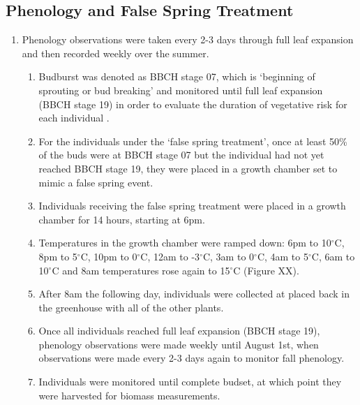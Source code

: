 \documentclass{article}\usepackage[]{graphicx}\usepackage[]{color}
\begin{document}
\subsection*{Phenology and False Spring Treatment}
\begin{enumerate}
\item Phenology observations were taken every 2-3 days through full leaf expansion and then recorded weekly over the summer.
  \begin{enumerate}
  \item Budburst was denoted as BBCH stage 07, which is `beginning of sprouting or bud breaking' and monitored until full leaf expansion (BBCH stage 19) in order to evaluate the duration of vegetative risk for each individual \citep{Finn2007}.
  \item For the individuals under the `false spring treatment', once at least 50\% of the buds were at BBCH stage 07 but the individual had not yet reached BBCH stage 19, they were placed in a growth chamber set to mimic a false spring event.
  \item Individuals receiving the false spring treatment were placed in a growth chamber for 14 hours, starting at 6pm. 
  \item Temperatures in the growth chamber were ramped down: 6pm to 10$^{\circ}$C, 8pm to 5$^{\circ}$C, 10pm to 0$^{\circ}$C, 12am to -3$^{\circ}$C, 3am to 0$^{\circ}$C, 4am to 5$^{\circ}$C, 6am to 10$^{\circ}$C and 8am temperatures rose again to 15$^{\circ}$C (Figure XX).
  \item After 8am the following day, individuals were collected at placed back in the greenhouse with all of the other plants. 
  \item Once all individuals reached full leaf expansion (BBCH stage 19), phenology observations were made weekly until August 1st, when observations were made every 2-3 days again to monitor fall phenology. 
  \item Individuals were monitored until complete budset, at which point they were harvested for biomass measurements.
  \end{enumerate}
\end{enumerate}
\end{document}
